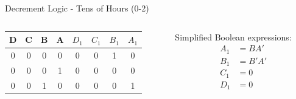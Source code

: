 \documentclass{beamer}
\begin{document}
\begin{frame}{Decrement Logic - Tens of Hours (0-2)}
    \begin{columns}
        \begin{column}{0.5\textwidth}
            \begin{table}
                \centering
                \scriptsize
                \begin{tabular}{|c|c|c|c|c|c|c|c|}
                \hline
                D & C & B & A & $D_1$ & $C_1$ & $B_1$ & $A_1$ \\ 
                \hline
                0 & 0 & 0 & 0 & 0 & 0 & 1 & 0 \\
                0 & 0 & 0 & 1 & 0 & 0 & 0 & 0 \\
                0 & 0 & 1 & 0 & 0 & 0 & 0 & 1 \\
                \hline
                \end{tabular}
            \end{table}
        \end{column}
        \begin{column}{0.5\textwidth}
            Simplified Boolean expressions:
            \begin{align*}
                A_1 &= BA' \\
                B_1 &= B'A' \\
                C_1 &= 0 \\
                D_1 &= 0
            \end{align*}
        \end{column}
    \end{columns}
\end{frame}
\end{document}
